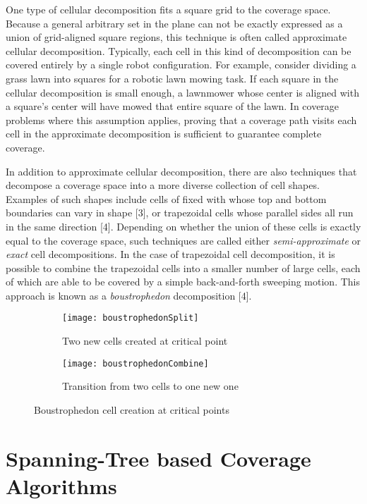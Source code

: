 One type of cellular decomposition fits a square grid to the coverage space. Because a general arbitrary set in the plane can not be exactly expressed as a union of grid-aligned square regions, this technique is often called approximate cellular decomposition. Typically, each cell in this kind of decomposition can be covered entirely by a single robot configuration. For example, consider dividing a grass lawn into squares for a robotic lawn mowing task. If each square in the cellular decomposition is small enough, a lawnmower whose center is aligned with a square's center will have mowed that entire square of the lawn. In coverage problems where this assumption applies, proving that a coverage path visits each cell in the approximate decomposition is sufficient to guarantee complete coverage.

In addition to approximate cellular decomposition, there are also techniques that decompose a coverage space into a more diverse collection of cell shapes. Examples of such shapes include cells of fixed with whose top and bottom boundaries can vary in shape [3], or trapezoidal cells whose parallel sides all run in the same direction [4]. Depending on whether the union of these cells is exactly equal to the coverage space, such techniques are called either \textit{semi-approximate} or \textit{exact} cell decompositions. In the case of trapezoidal cell decomposition, it is possible to combine the trapezoidal cells into a smaller number of large cells, each of which are able to be covered by a simple back-and-forth sweeping motion. This approach is known as a \textit{boustrophedon} decomposition [4].

\begin{figure}[H]
\begin{subfigure}{.5\textwidth}
  \centering
  \texttt{[image: boustrophedonSplit]}
  \caption{Two new cells created at critical point}
\end{subfigure}
\begin{subfigure}{.5\textwidth}
  \centering
  \texttt{[image: boustrophedonCombine]}
  \caption{Transition from two cells to one new one}
\end{subfigure}
\caption[Boustrophedon Decomposition]{Boustrophedon cell creation at critical points}
\end{figure}

\section{Spanning-Tree based Coverage Algorithms}

